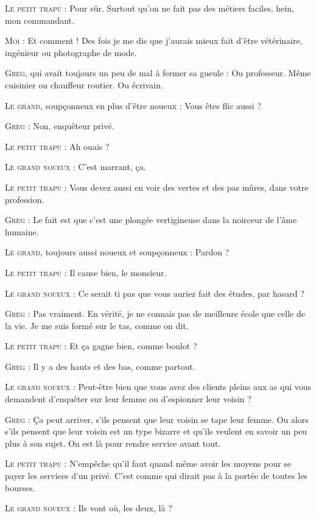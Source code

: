 \begin{dialogue}
\textsc{Le petit trapu} : Pour sûr. Surtout qu’on ne fait pas des métiers faciles, hein, mon commandant.

\textsc{Moi} : Et comment ! Des fois je me dis que j’aurais mieux fait d’être vétérinaire, ingénieur ou photographe de mode.

\textsc{Greg}, qui avait toujours un peu de mal à fermer sa gueule : Ou professeur. Même cuisinier ou chauffeur routier. Ou écrivain.

\textsc{Le grand}, soupçonneux en plus d’être noueux : Vous êtes flic aussi ?

\textsc{Greg} : Non, enquêteur privé.

\textsc{Le petit trapu} : Ah ouais ?

\textsc{Le grand noueux} : C’est marrant, ça.

\textsc{Le petit trapu} : Vous devez aussi en voir des vertes et des pas mûres, dans votre profession.

\textsc{Greg} : Le fait est que c’est une plongée vertigineuse dans la noirceur de l’âme humaine.

\textsc{Le grand}, toujours aussi noueux et soupçonneux : Pardon ?

\textsc{Le petit trapu} : Il cause bien, le monsieur.

\textsc{Le grand noueux} : Ce serait ti pas que vous auriez fait des études, par hasard ?

\textsc{Greg} : Pas vraiment. En vérité, je ne connais pas de meilleure école que celle de la vie. Je me suis formé sur le tas, comme on dit.

\textsc{Le petit trapu} : Et ça gagne bien, comme boulot ?

\textsc{Greg} : Il y a des hauts et des bas, comme partout.

\textsc{Le grand noueux} : Peut-être bien que vous avez des clients pleins aux as qui vous demandent d’enquêter sur leur femme ou d’espionner leur voisin ?

\textsc{Greg} : Ça peut arriver, s’ils pensent que leur voisin se tape leur femme. Ou alors s’ils pensent que leur voisin est un type bizarre et qu’ils veulent en savoir un peu plus à son sujet. On est là pour rendre service avant tout.

\textsc{Le petit trapu} : N’empêche qu’il faut quand même avoir les moyens pour se payer les services d’un privé. C’est comme qui dirait pas à la portée de toutes les bourses.

\textsc{Le grand noueux} : Ils vont où, les deux, là ?

\end{dialogue}

